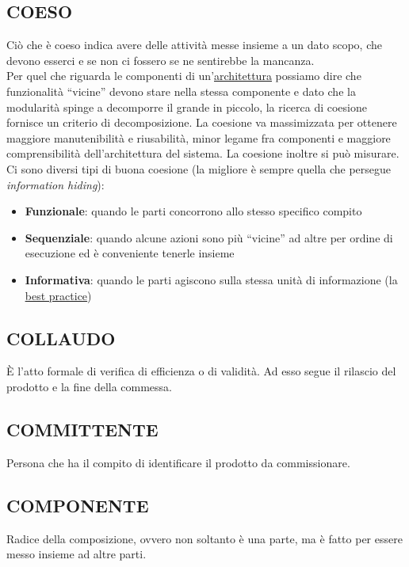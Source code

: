 		\subsection{COESO}  \label{coeso}
		Ciò che è coeso indica avere delle attività messe insieme a un dato scopo, che devono esserci e se non ci fossero se ne sentirebbe la mancanza.  \\
		Per quel che riguarda le componenti di un'\underline{\hyperref[architettura]{architettura}} possiamo dire che funzionalità ``vicine'' devono stare nella stessa componente e dato che la modularità spinge a decomporre il grande in piccolo, la ricerca di coesione fornisce un criterio di decomposizione. La coesione va massimizzata per ottenere maggiore manutenibilità e riusabilità, minor legame fra componenti e maggiore comprensibilità dell’architettura del sistema. La coesione inoltre si può misurare. \\
		Ci sono diversi tipi di buona coesione (la migliore è sempre quella che persegue \textit{information hiding}):
			\begin{itemize}
				\item \textbf{Funzionale}: quando le parti concorrono allo stesso specifico compito
				\item \textbf{Sequenziale}: quando alcune azioni sono più ``vicine'' ad altre per ordine di esecuzione ed è conveniente tenerle insieme
				\item \textbf{Informativa}: quando le parti agiscono sulla stessa unità di informazione (la \underline{\hyperref[best]{best practice}})
			\end{itemize}

		\subsection{COLLAUDO}		\label{collaudo}
		È l'atto formale di verifica di efficienza o di validità.  Ad esso segue il rilascio del prodotto e la fine della commessa.

		\subsection{COMMITTENTE}  \label{committente}
		Persona che ha il compito di identificare il prodotto da commissionare.

		\subsection{COMPONENTE}  \label{componente}
		Radice della composizione, ovvero non soltanto è una parte, ma è fatto per essere messo insieme ad altre parti.

